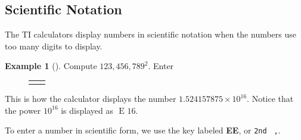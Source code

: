 \documentclass[10pt,]{book}
\newcommand{\terminology}[1]{\textbf{#1}}
\theoremstyle{plain}
\theoremstyle{definition}
\theoremstyle{definition}
\newtheorem{example}[theorem]{Example}
\theoremstyle{definition}
\numberwithin{equation}{part}
\newlength{\panelmax}
\begin{document}
\subsection[{Scientific Notation}]{Scientific Notation}\label{subsection-71}
The TI calculators display numbers in scientific notation when the numbers use too many digits to display.%
\begin{example}[]\label{example-109}
Compute \(123,456,789^2 \). Enter%
{%
\setlength{\panelmax}{0pt}
\newsavebox{\panelboxAJSp}
\newlength{\phAJSp}\setlength{\phAJSp}{\ht\panelboxAJSp+\dp\panelboxAJSp}
\settototalheight{\phAJSp}{\usebox{\panelboxAJSp}}
\setlength{\panelmax}{\maxof{\panelmax}{\phAJSp}}
\newsavebox{\panelboxAJTp}
\newlength{\phAJTp}\setlength{\phAJTp}{\ht\panelboxAJTp+\dp\panelboxAJTp}
\settototalheight{\phAJTp}{\usebox{\panelboxAJTp}}
\setlength{\panelmax}{\maxof{\panelmax}{\phAJTp}}
\leavevmode%
\setlength{\tabcolsep}{0.025\textwidth}
\begin{figure}
\begin{tabular}{@{}*{2}{c}@{}}
\begin{minipage}[c][\panelmax][t]{0.65\textwidth}\usebox{\panelboxAJSp}\end{minipage}&
\begin{minipage}[c][\panelmax][t]{0.3\textwidth}\usebox{\panelboxAJTp}\end{minipage}\end{tabular}
\end{figure}
}%
\end{example}
\par
This is how the calculator displays the number \(1.524157875 \times 10^{16}\). Notice that the power \(10^{16}\) is displayed as \(\text{ E }16\).%
\par
To enter a number in scientific form, we use the key labeled \terminology{EE}, or \lstinline?2nd? \lstinline? ,?.%
\end{document}
